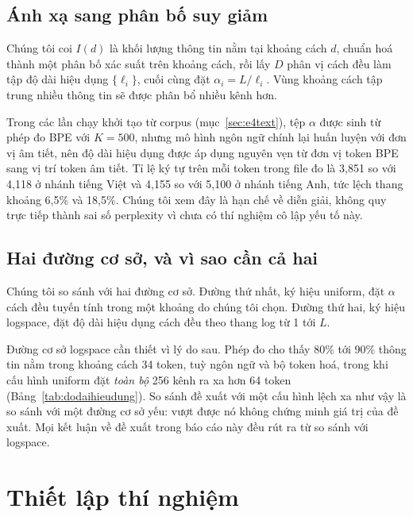 \documentclass[11pt]{article}
\begin{document}
\subsection{Ánh xạ sang phân bố suy giảm}

Chúng tôi coi $I(d)$ là khối lượng thông tin nằm tại khoảng cách $d$, chuẩn hoá
thành một phân bố xác suất trên khoảng cách, rồi lấy $D$ phân vị cách đều làm
tập độ dài hiệu dụng $\{\ell_i\}$, cuối cùng đặt $\alpha_i = L / \ell_i$. Vùng
khoảng cách tập trung nhiều thông tin sẽ được phân bổ nhiều kênh hơn.

Trong các lần chạy khởi tạo từ corpus (mục~\ref{sec:e4text}), tệp $\alpha$ được
sinh từ phép đo BPE với $K=500$, nhưng mô hình ngôn ngữ chính lại huấn luyện với
đơn vị âm tiết, nên độ dài hiệu dụng được áp dụng nguyên vẹn từ đơn vị token BPE
sang vị trí token âm tiết.
Tỉ lệ ký tự trên mỗi token trong file đo là 3,851 so với 4,118 ở nhánh tiếng
Việt và 4,155 so với 5,100 ở nhánh tiếng Anh, tức lệch thang khoảng 6,5\% và
18,5\%. Chúng tôi xem đây là hạn chế về diễn giải, không quy trực tiếp thành sai
số perplexity vì chưa có thí nghiệm cô lập yếu tố này.

\subsection{Hai đường cơ sở, và vì sao cần cả hai}

Chúng tôi so sánh với hai đường cơ sở. Đường thứ nhất, ký hiệu \textsf{uniform},
đặt $\alpha$ cách đều tuyến tính trong một khoảng do chúng tôi chọn. Đường thứ
hai, ký hiệu \textsf{logspace}, đặt độ dài hiệu dụng cách đều theo thang log từ
1 tới $L$.

Đường cơ sở \textsf{logspace} cần thiết vì lý do sau. Phép đo cho thấy 80\%
tới 90\% thông tin nằm trong khoảng cách 34 token, tuỳ ngôn ngữ và bộ token
hoá, trong khi cấu hình \textsf{uniform}
đặt \emph{toàn bộ} 256 kênh ra xa hơn 64 token (Bảng~\ref{tab:dodaihieudung}).
So sánh đề xuất với một cấu hình lệch xa như vậy là so sánh với một đường cơ sở
yếu: vượt được nó không chứng minh giá trị của đề xuất. Mọi kết luận về đề xuất
trong báo cáo này đều rút ra từ so sánh với \textsf{logspace}.

\section{Thiết lập thí nghiệm}
\end{document}
